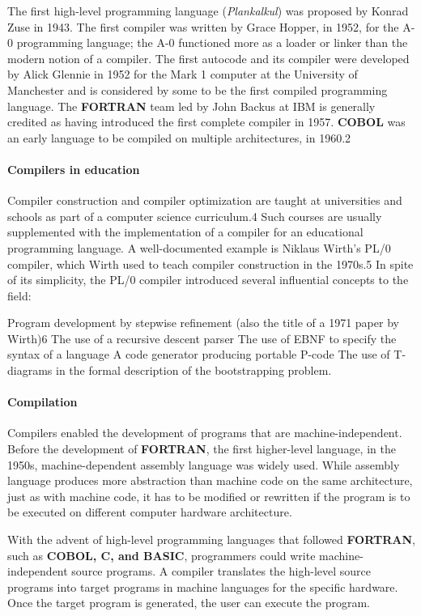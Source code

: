 \documentclass{article}
\begin{document}
The first high-level programming language (\textit{Plankalkul}) was proposed by Konrad Zuse in 1943. The first compiler was written by Grace Hopper, in 1952, for the A-0 programming language; the A-0 functioned more as a loader or linker than the modern notion of a compiler. The first autocode and its compiler were developed by Alick Glennie in 1952 for the Mark 1 computer at the University of Manchester and is considered by some to be the first compiled programming language. The \textbf{FORTRAN} team led by John Backus at IBM is generally credited as having introduced the first complete compiler in 1957. \textbf{COBOL} was an early language to be compiled on multiple architectures, in 1960.2

\paragraph{Compilers in education}
Compiler construction and compiler optimization are taught at universities and schools as part of a computer science curriculum.4 Such courses are usually supplemented with the implementation of a compiler for an educational programming language. A well-documented example is Niklaus Wirth's PL/0 compiler, which Wirth used to teach compiler construction in the 1970s.5 In spite of its simplicity, the PL/0 compiler introduced several influential concepts to the field:

    Program development by stepwise refinement (also the title of a 1971 paper by Wirth)6
    The use of a recursive descent parser
    The use of EBNF to specify the syntax of a language
    A code generator producing portable P-code
    The use of T-diagrams in the formal description of the bootstrapping problem.

\paragraph{Compilation}
Compilers enabled the development of programs that are machine-independent. Before the development of \textbf{FORTRAN}, the first higher-level language, in the 1950s, machine-dependent assembly language was widely used. While assembly language produces more abstraction than machine code on the same architecture, just as with machine code, it has to be modified or rewritten if the program is to be executed on different computer hardware architecture.

With the advent of high-level programming languages that followed \textbf{FORTRAN}, such as \textbf{COBOL, C, and BASIC}, programmers could write machine-independent source programs. A compiler translates the high-level source programs into target programs in machine languages for the specific hardware. Once the target program is generated, the user can execute the program.
\end{document}
